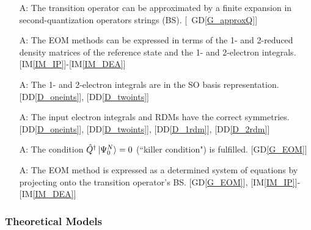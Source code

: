 \documentclass[12pt]{article}
\newcommand{\dref}[1]{GD\ref{#1}}
\newcommand{\ddref}[1]{DD\ref{#1}}
\newcounter{assumpnum} %
\newcommand{\iref}[1]{IM\ref{#1}}
\begin{document}
\begin{itemize}

\item[A\refstepcounter{assumpnum}\theassumpnum \label{A_transition_op_approx}:] 
The 
transition operator can be approximated by a finite expansion in 
second-quantization operators strings (BS). [~\dref{G_approxQ}]
\item[A\refstepcounter{assumpnum}\theassumpnum \label{A_dms_mointeg}:] The EOM 
methods can be expressed in terms of the 1- and 2-reduced density
matrices of the reference state and the 1- and 2-electron integrals.
[\iref{IM_IP}]-[\iref{IM_DEA}]
\item[A\refstepcounter{assumpnum}\theassumpnum \label{A_int_mos}:] The 1- and 
2-electron integrals are in the SO basis representation. [\ddref{D_oneints}], 
[\ddref{D_twoints}]
\item[A\refstepcounter{assumpnum}\theassumpnum \label{A_symmetry}:] The input 
electron integrals and RDMs have the correct symmetries.[\ddref{D_oneints}], 
[\ddref{D_twoints}], [\ddref{D_1rdm}], 
[\ddref{D_2rdm}]
\item[A\refstepcounter{assumpnum}\theassumpnum \label{A_killercond}:] The 
condition $\hat{Q}^{\dagger}\ket{\Psi^{N}_0} = 0$ (``killer condition") is 
fulfilled. [\dref{G_EOM}]
\item[A\refstepcounter{assumpnum}\theassumpnum \label{A_sproj}:] The EOM method 
is expressed as a determined system of equations by projecting onto the 
transition operator's BS. [\dref{G_EOM}], [\iref{IM_IP}]-[\iref{IM_DEA}]

\end{itemize}

\subsubsection{Theoretical Models}\label{sec_theoretical}

\end{document}
